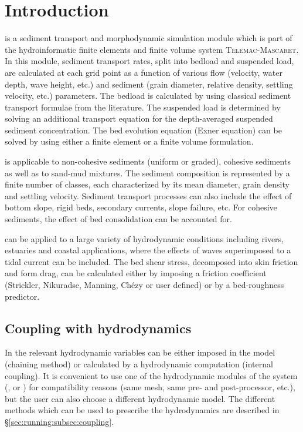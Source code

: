 \section{Introduction}\label{sec:introduction}
\sisyphe is a sediment transport and morphodynamic simulation module which is part of the hydroinformatic finite elements and finite volume system {\scshape Telemac-Mascaret}. In this module, sediment transport rates, split into bedload and suspended load, are calculated at each grid point as a function of various flow (velocity, water depth, wave height, etc.) and sediment (grain diameter, relative density, settling velocity, etc.) parameters. The bedload is calculated by using classical sediment transport formulae from the literature. The suspended load is determined by solving an additional transport equation for the depth-averaged suspended sediment concentration. The bed evolution equation (Exner equation) can be solved by using either a finite element or a finite volume formulation.

\sisyphe is applicable to non-cohesive sediments (uniform or graded), cohesive sediments as well as to sand-mud mixtures. The sediment composition is represented by a finite number of classes, each characterized by its mean diameter, grain density and settling velocity. Sediment transport processes can also include the effect of bottom slope, rigid beds, secondary currents, slope failure, etc. For cohesive sediments, the effect of bed consolidation can be accounted for.

\sisyphe can be applied to a large variety of hydrodynamic conditions including rivers, estuaries and coastal applications, where the effects of waves superimposed to a tidal current can be included. The bed shear stress, decomposed into skin friction and form drag, can be calculated either by imposing a friction coefficient (Strickler, Nikuradse, Manning, Ch\'{e}zy or user defined) or by a bed-roughness predictor.

\subsection{Coupling with hydrodynamics}
In \sisyphe the relevant hydrodynamic variables can be either imposed in the model (chaining method) or calculated by a hydrodynamic computation (internal coupling). It is convenient to use one of the hydrodynamic modules of the \tel system (\teldd, \telddd or \tomawac) for compatibility reasons (same mesh, same pre- and post-processor, etc.), but the user can also choose a different hydrodynamic model. The different methods which can be used to prescribe the hydrodynamics are described in \S \ref{sec:running:subsec:coupling}.

